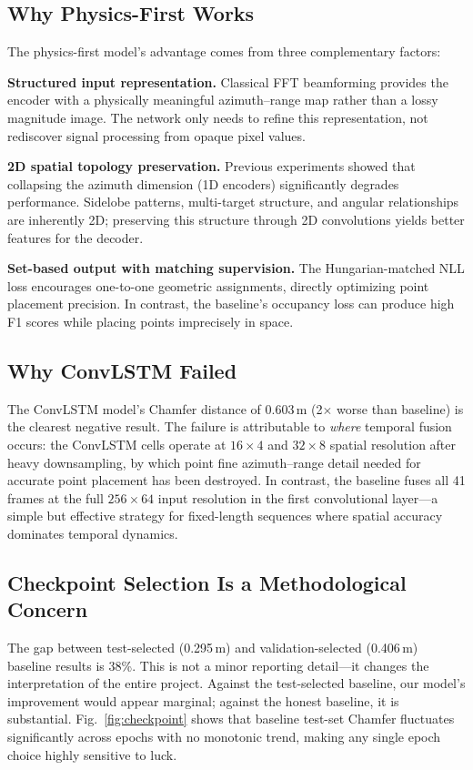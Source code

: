 \documentclass[conference]{IEEEtran}
\begin{document}
\subsection{Why Physics-First Works}

The physics-first model's advantage comes from three complementary factors:

\textbf{Structured input representation.}
Classical FFT beamforming provides the encoder with a physically meaningful azimuth--range map rather than a lossy magnitude image.
The network only needs to refine this representation, not rediscover signal processing from opaque pixel values.

\textbf{2D spatial topology preservation.}
Previous experiments showed that collapsing the azimuth dimension (1D encoders) significantly degrades performance.
Sidelobe patterns, multi-target structure, and angular relationships are inherently 2D; preserving this structure through 2D convolutions yields better features for the decoder.

\textbf{Set-based output with matching supervision.}
The Hungarian-matched NLL loss encourages one-to-one geometric assignments, directly optimizing point placement precision.
In contrast, the baseline's occupancy loss can produce high F1 scores while placing points imprecisely in space.

\subsection{Why ConvLSTM Failed}

The ConvLSTM model's Chamfer distance of 0.603\,m (2$\times$ worse than baseline) is the clearest negative result.
The failure is attributable to \emph{where} temporal fusion occurs: the ConvLSTM cells operate at $16 \times 4$ and $32 \times 8$ spatial resolution after heavy downsampling, by which point fine azimuth--range detail needed for accurate point placement has been destroyed.
In contrast, the baseline fuses all 41 frames at the full $256 \times 64$ input resolution in the first convolutional layer---a simple but effective strategy for fixed-length sequences where spatial accuracy dominates temporal dynamics.

\subsection{Checkpoint Selection Is a Methodological Concern}

The gap between test-selected (0.295\,m) and validation-selected (0.406\,m) baseline results is 38\%.
This is not a minor reporting detail---it changes the interpretation of the entire project.
Against the test-selected baseline, our model's improvement would appear marginal; against the honest baseline, it is substantial.
Fig.~\ref{fig:checkpoint} shows that baseline test-set Chamfer fluctuates significantly across epochs with no monotonic trend, making any single epoch choice highly sensitive to luck.
\end{document}
